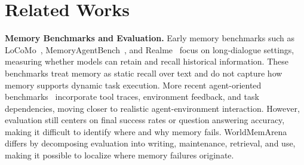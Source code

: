 \documentclass{article}
\begin{document}



\section{Related Works}
\label{sec:related}

\textbf{Memory Benchmarks and Evaluation.} Early memory benchmarks such as LoCoMo~\cite{maharana2024evaluating}, MemoryAgentBench~\cite{hu2025evaluating}, and Realme~\cite{bian2026realmembenchmarkingllmsrealworld} focus on long-dialogue settings, measuring whether models can retain and recall historical information. These benchmarks treat memory as static recall over text and do not capture how memory supports dynamic task execution. More recent agent-oriented benchmarks~\cite{he2026memoryarenabenchmarkingagentmemory, zhao2026amabenchevaluatinglonghorizonmemory} incorporate tool traces, environment feedback, and task dependencies, moving closer to realistic agent-environment interaction. However, evaluation still centers on final success rates or question answering accuracy, making it difficult to identify where and why memory fails. WorldMemArena differs by decomposing evaluation into writing, maintenance, retrieval, and use, making it possible to localize where memory failures originate.
\end{document}
